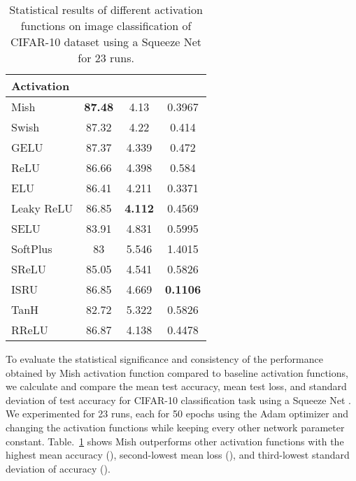 \documentclass{bmvc2k}
\begin{document}
\begin{table}[h]
	\begin{center}
		\begin{tabular}{|l|c|c|c|}
			\hline
			Activation &  &  &  \\
			\hline\hline
			Mish    & \textbf{87.48} & 4.13 & 0.3967 \\
			Swish \cite{ramachandran2017searching} & 87.32 & 4.22 & 0.414 \\
			GELU \cite{hendrycks2016gaussian} & 87.37 & 4.339 & 0.472 \\
			ReLU \cite{nair2010rectified,krizhevsky2012imagenet} & 86.66 & 4.398 & 0.584 \\
			ELU \cite{clevert2015fast} & 86.41 & 4.211 & 0.3371 \\
			Leaky ReLU \cite{maas2013rectifier} & 86.85 & \textbf{4.112} & 0.4569  \\
			SELU \cite{klambauer2017self} & 83.91 & 4.831 & 0.5995 \\
			SoftPlus & 83 & 5.546 & 1.4015 \\
			SReLU \cite{jin2016deep} & 85.05 & 4.541 & 0.5826 \\
			ISRU \cite{carlile2017improving} & 86.85 & 4.669 & \textbf{0.1106}\\
			TanH & 82.72 & 5.322 & 0.5826\\
			RReLU \cite{xu2015empirical} & 86.87 & 4.138 & 0.4478\\
			\hline
		\end{tabular}
	\end{center}
	\caption{Statistical results of different activation functions on image classification of CIFAR-10 dataset using a Squeeze Net for 23 runs.}
	\label{tab:p-values}
\end{table}

To evaluate the statistical significance and consistency of the performance obtained by Mish activation function compared to baseline activation functions, we calculate and compare the mean test accuracy, mean test loss, and standard deviation of test accuracy for CIFAR-10 \cite{krizhevsky2009learning} classification task using a Squeeze Net \cite{hu2018squeeze}. We experimented for 23 runs, each for 50 epochs using the Adam optimizer \cite{kingma2014adam} and changing the activation functions while keeping every other network parameter constant. Table.~\ref{tab:p-values} shows Mish outperforms other activation functions with the highest mean accuracy (), second-lowest mean loss (), and third-lowest standard deviation of accuracy ().
\end{document}
